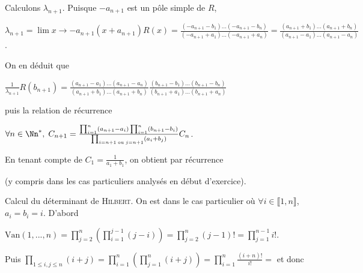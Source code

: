 {{Calculons $\lambda_{n+1}$. Puisque $-a_{n+1}$ est un pôle simple de $R$, 

\begin{center}
$\lambda_{n+1}=\lim{x \rightarrow -a_{n+1}}(x+a_{n+1})R(x)=\frac{(-a_{n+1}-b_1)\ldots(-a_{n+1}-b_n)}{(-a_{n+1}+a_1)\ldots(-a_{n+1}+a_n)}=\frac{(a_{n+1}+b_1)\ldots(a_{n+1}+b_n)}{(a_{n+1}-a_1)\ldots(a_{n+1}-a_n)}$.
\end{center}

On en déduit que

\begin{center}
$\frac{1}{\lambda_{n+1}} R(b_{n+1}) =\frac{(a_{n+1}-a_1)\ldots(a_{n+1}-a_n)}{(a_{n+1}+b_1)\ldots(a_{n+1}+b_n)}\frac{(b_{n+1}-b_1)\ldots(b_{n+1}-b_n)}{(b_{n+1}+a_1)\ldots(b_{n+1}+a_n)}$
\end{center}

puis la relation de récurrence

\begin{center}
$\forall n\in\Nn^*,\;C_{n+1}=\frac{\prod_{i=1}^{n}(a_{n+1}-a_i)\prod_{i=1}^{n}(b_{n+1}-b_i)}{\prod_{i=n+1\;\text{ou}\;j=n+1}(a_{i}+b_j)}C_n$.
\end{center}

En tenant compte de $C_1=\frac{1}{a_1+b_1}$, on obtient par récurrence

\begin{center}
\end{center}

(y compris dans les cas particuliers analysés en début d'exercice).

Calcul du déterminant de \textsc{Hilbert}. On est dans le cas particulier où $\forall i\in\llbracket1,n\rrbracket$, $a_i = b_i = i$.
D'abord

\begin{center}
$\text{Van}(1,...,n)=\prod_{j=2}^{n}\left(\prod_{i=1}^{j-1}(j-i)\right)=\prod_{j=2}^{n}(j-1)! =\prod_{j=1}^{n-1}i!$.
\end{center}

Puis $\prod_{1\leqslant i,j\leqslant n}^{}(i+j)=\prod_{i=1}^{n}\left(\prod_{j=1}^{n}(i+j)\right)=\prod_{i=1}^{n}\frac{(i+n)!}{i!}=$   et donc

\begin{center}
\end{center}
}
}

